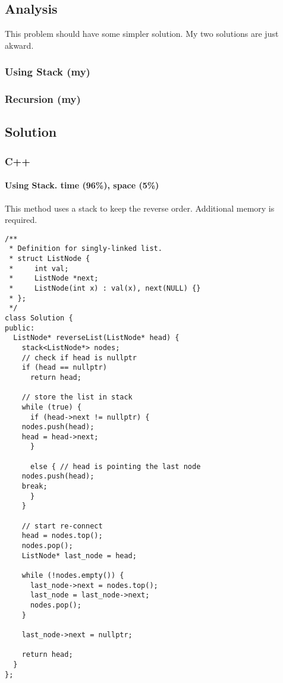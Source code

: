 \documentclass[12pt]{article}
\begin{document}
\subsection{Analysis}
\label{sec:org454ee44}
This problem should have some simpler solution. My two solutions are just akward.
\subsubsection{Using Stack (my)}
\label{sec:org29a6938}
\subsubsection{Recursion (my)}
\label{sec:orga65eb20}
\subsection{Solution}
\label{sec:org4c6e56f}
\subsubsection{C++}
\label{sec:orgfed44ab}
\paragraph{Using Stack. time (96\%), space (5\%)}
\label{sec:orgd2761b7}
This method uses a stack to keep the reverse order. Additional memory is required.
\begin{verbatim}
/**
 * Definition for singly-linked list.
 * struct ListNode {
 *     int val;
 *     ListNode *next;
 *     ListNode(int x) : val(x), next(NULL) {}
 * };
 */
class Solution {
public:
  ListNode* reverseList(ListNode* head) {
    stack<ListNode*> nodes;
    // check if head is nullptr
    if (head == nullptr)
      return head;

    // store the list in stack 
    while (true) {
      if (head->next != nullptr) {
	nodes.push(head);
	head = head->next;
      }

      else { // head is pointing the last node
	nodes.push(head);
	break;
      }
    }

    // start re-connect
    head = nodes.top();
    nodes.pop();
    ListNode* last_node = head;

    while (!nodes.empty()) {
      last_node->next = nodes.top();
      last_node = last_node->next;
      nodes.pop();
    }

    last_node->next = nullptr;

    return head;
  }
};
\end{verbatim}
\end{document}
